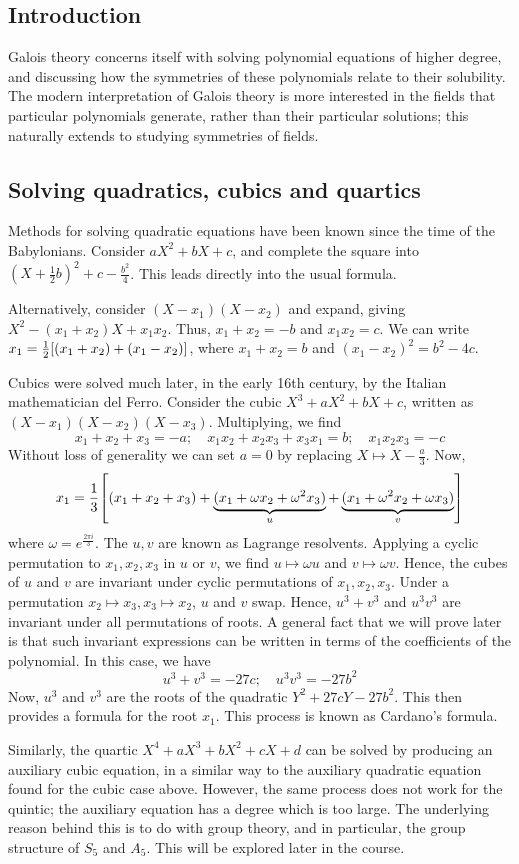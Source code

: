\subsection{Introduction}
Galois theory concerns itself with solving polynomial equations of higher degree, and discussing how the symmetries of these polynomials relate to their solubility.
The modern interpretation of Galois theory is more interested in the fields that particular polynomials generate, rather than their particular solutions; this naturally extends to studying symmetries of fields.

\subsection{Solving quadratics, cubics and quartics}
Methods for solving quadratic equations have been known since the time of the Babylonians.
Consider \( aX^2 + bX + c \), and complete the square into \( (X + \frac{1}{2} b)^2 + c - \frac{b^2}{4} \).
This leads directly into the usual formula.

Alternatively, consider \( (X-x_1)(X-x_2) \) and expand, giving \( X^2 - (x_1 + x_2) X + x_1 x_2 \).
Thus, \( x_1 + x_2 = -b \) and \( x_1 x_2 = c \).
We can write \( x_1 = \frac{1}{2} \qty[(x_1 + x_2) + (x_1 - x_2)] \), where \( x_1 + x_2 = b \) and \( (x_1 - x_2)^2 = b^2 - 4c \).

Cubics were solved much later, in the early 16th century, by the Italian mathematician del Ferro.
Consider the cubic \( X^3 + aX^2 + bX + c \), written as \( (X-x_1)(X-x_2)(X-x_3) \).
Multiplying, we find
\[ x_1 + x_2 + x_3 = -a;\quad x_1 x_2 + x_2 x_3 + x_3 x_1 = b;\quad x_1 x_2 x_3 = -c \]
Without loss of generality we can set \( a = 0 \) by replacing \( X \mapsto X - \frac{a}{3} \).
Now,
\[ x_1 = \frac{1}{3} \qty[(x_1 + x_2 + x_3) + \underbrace{(x_1 + \omega x_2 + \omega^2 x_3)}_{u} + \underbrace{(x_1 + \omega^2 x_2 + \omega x_3)}_{v}] \]
where \( \omega = e^{\frac{2\pi i}{3}} \).
The \( u, v \) are known as Lagrange resolvents.
Applying a cyclic permutation to \( x_1, x_2, x_3 \) in \( u \) or \( v \), we find \( u \mapsto \omega u \) and \( v \mapsto \omega v \).
Hence, the cubes of \( u \) and \( v \) are invariant under cyclic permutations of \( x_1, x_2, x_3 \).
Under a permutation \( x_2 \mapsto x_3, x_3 \mapsto x_2 \), \( u \) and \( v \) swap.
Hence, \( u^3 + v^3 \) and \( u^3 v^3 \) are invariant under all permutations of roots.
A general fact that we will prove later is that such invariant expressions can be written in terms of the coefficients of the polynomial.
In this case, we have
\[ u^3 + v^3 = -27c;\quad u^3 v^3 = -27 b^2 \]
Now, \( u^3 \) and \( v^3 \) are the roots of the quadratic \( Y^2 + 27cY - 27b^2 \).
This then provides a formula for the root \( x_1 \).
This process is known as Cardano's formula.

Similarly, the quartic \( X^4 + aX^3 + bX^2 + cX + d \) can be solved by producing an auxiliary cubic equation, in a similar way to the auxiliary quadratic equation found for the cubic case above.
However, the same process does not work for the quintic; the auxiliary equation has a degree which is too large.
The underlying reason behind this is to do with group theory, and in particular, the group structure of \( S_5 \) and \( A_5 \).
This will be explored later in the course.
